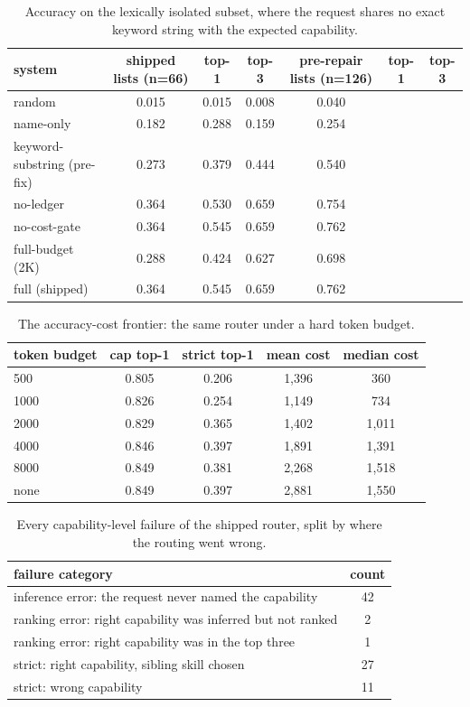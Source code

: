 \documentclass[sigconf,acmsmall]{acmart}
\begin{document}
\begin{table}[t]
\centering
\caption{Accuracy on the lexically isolated subset, where the request shares no exact keyword string with the expected capability.}
\label{tab:isolation}
\begin{tabular}{lcccccc}
\toprule
\textbf{system} & \textbf{shipped lists (n=66)} & \textbf{top-1} & \textbf{top-3} & \textbf{pre-repair lists (n=126)} & \textbf{top-1} & \textbf{top-3} \\
\midrule
random & 0.015 & 0.015 & 0.008 & 0.040 \\
name-only & 0.182 & 0.288 & 0.159 & 0.254 \\
keyword-substring (pre-fix) & 0.273 & 0.379 & 0.444 & 0.540 \\
no-ledger & 0.364 & 0.530 & 0.659 & 0.754 \\
no-cost-gate & 0.364 & 0.545 & 0.659 & 0.762 \\
full-budget (2K) & 0.288 & 0.424 & 0.627 & 0.698 \\
full (shipped) & 0.364 & 0.545 & 0.659 & 0.762 \\
\bottomrule
\end{tabular}
\end{table}
\begin{table}[t]
\centering
\caption{The accuracy-cost frontier: the same router under a hard token budget.}
\label{tab:frontier}
\begin{tabular}{lcccc}
\toprule
\textbf{token budget} & \textbf{cap top-1} & \textbf{strict top-1} & \textbf{mean cost} & \textbf{median cost} \\
\midrule
500 & 0.805 & 0.206 & 1,396 & 360 \\
1000 & 0.826 & 0.254 & 1,149 & 734 \\
2000 & 0.829 & 0.365 & 1,402 & 1,011 \\
4000 & 0.846 & 0.397 & 1,891 & 1,391 \\
8000 & 0.849 & 0.381 & 2,268 & 1,518 \\
none & 0.849 & 0.397 & 2,881 & 1,550 \\
\bottomrule
\end{tabular}
\end{table}
\begin{table}[t]
\centering
\caption{Every capability-level failure of the shipped router, split by where the routing went wrong.}
\label{tab:errors}
\begin{tabular}{lc}
\toprule
\textbf{failure category} & \textbf{count} \\
\midrule
inference error: the request never named the capability & 42 \\
ranking error: right capability was inferred but not ranked & 2 \\
ranking error: right capability was in the top three & 1 \\
strict: right capability, sibling skill chosen & 27 \\
strict: wrong capability & 11 \\
\bottomrule
\end{tabular}
\end{table}
\end{document}
